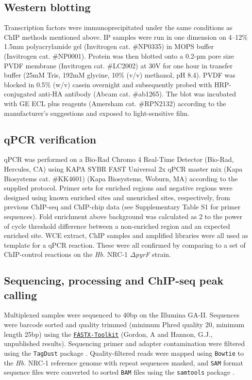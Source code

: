 \subsection{Western blotting}

Transcription factors were immunoprecipitated under the same conditions as ChIP methods mentioned above. IP samples were run in one dimension on 4--12\% 1.5mm polyacrylamide gel (Invitrogen cat. \#NP0335) in MOPS buffer (Invitrogen cat. \#NP0001). Protein was then blotted onto a 0.2-µm pore size PVDF membrane (Invitrogen cat. \#LC2002) at 30V for one hour in transfer buffer (25mM Tris, 192mM glycine, 10\% (v/v) methanol, pH 8.4). PVDF was blocked in 0.5\% (w/v) casein overnight and subsequently probed with HRP-conjugated anti-HA antibody (Abcam cat. \#ab1265). The blot was incubated with GE ECL plus reagents (Amersham cat. \#RPN2132) according to the manufacturer's suggestions and exposed to light-sensitive film.

\subsection{qPCR verification}

qPCR was performed on a Bio-Rad Chromo 4 Real-Time Detector (Bio-Rad, Hercules, CA) using KAPA SYBR FAST Universal 2x qPCR master mix (Kapa Biosystems cat. \#KK4601) (Kapa Biosystems, Woburn, MA) according to the supplied protocol. Primer sets for enriched regions and negative regions were designed using known enriched sites and unenriched sites, respectively, from previous ChIP-seq and ChIP-chip data (see Supplementary Table S1 for primer sequences). Fold enrichment above background was calculated as 2 to the power of cycle threshold difference between a non-enriched region and an expected enriched site. WCE extract, ChIP samples and amplified libraries were all used as template for a qPCR reaction. These were all confirmed by comparing to a set of ChIP-control reactions on the {\em Hb.} NRC-1 $\Delta${\em pyrF}  strain.

\subsection{Sequencing, processing and ChIP-seq peak calling}

Multiplexed samples were sequenced to 40bp on the Illumina GA-II. Sequences were barcode sorted and quality trimmed (minimum Phred quality 20, minimum length 25bp) using the \href{http://hannonlab.cshl.edu/fastx_toolkit/}{\tt FASTX-Toolkit} (Gordon, A and Hannon, G.J., unpublished results). Sequencing primer and adapter contamination were filtered using the {\tt TagDust} package \cite{lassmann_tagdust-program_2009}. Quality-filtered reads were mapped using {\tt Bowtie} \cite{langmead2009ultrafast} to the {\em Hb.} NRC-1 reference genome with repeat sequences masked, and {\tt SAM} format sequence files were converted to sorted {\tt BAM} files using the {\tt samtools} package \cite{li_sequence_2009}.

